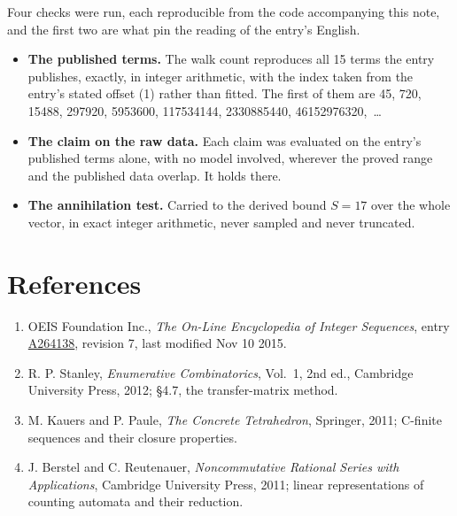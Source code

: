 \documentclass[11pt]{article}
\theoremstyle{definition}
\begin{document}
Four checks were run, each reproducible from the code accompanying this note, and the first two are what pin the reading of the entry's English.

\begin{itemize}

\item {\bfseries The published terms.} The walk count reproduces all 15 terms the entry publishes, exactly, in integer arithmetic, with the index taken from the entry's stated offset (1) rather than fitted. The first of them are 45, 720, 15488, 297920, 5953600, 117534144, 2330885440, 46152976320,~\dots

\item {\bfseries The claim on the raw data.} Each claim was evaluated on the entry's published terms alone, with no model involved, wherever the proved range and the published data overlap. It holds there.

\item {\bfseries The annihilation test.} Carried to the derived bound $S = 17$ over the whole vector, in exact integer arithmetic, never sampled and never truncated.

\end{itemize}

\section{References}

\begin{enumerate}

\item OEIS Foundation Inc., \emph{The On-Line Encyclopedia of Integer Sequences}, entry \href{https://oeis.org/A264138}{A264138}, revision 7, last modified Nov 10 2015.

\item R. P. Stanley, \emph{Enumerative Combinatorics}, Vol.~1, 2nd ed., Cambridge University Press, 2012; \S4.7, the transfer-matrix method.

\item M. Kauers and P. Paule, \emph{The Concrete Tetrahedron}, Springer, 2011; C-finite sequences and their closure properties.

\item J. Berstel and C. Reutenauer, \emph{Noncommutative Rational Series with Applications}, Cambridge University Press, 2011; linear representations of counting automata and their reduction.

\end{enumerate}
\end{document}
